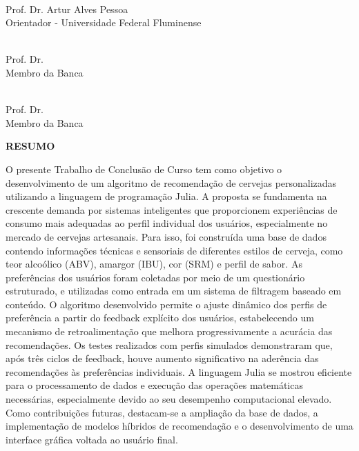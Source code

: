 \documentclass[12pt,a4paper]{article}
\begin{document}
\vspace{4cm}

\begin{center}
\underline{\hspace{8cm}}\\
Prof. Dr. Artur Alves Pessoa\\
Orientador - Universidade Federal Fluminense

\vspace{2cm}

\underline{\hspace{8cm}}\\
Prof. Dr. \underline{\hspace{4cm}}\\
Membro da Banca

\vspace{2cm}

\underline{\hspace{8cm}}\\
Prof. Dr. \underline{\hspace{4cm}}\\
Membro da Banca
\end{center}

\newpage
\begin{center}
\Large
\textbf{RESUMO}
\end{center}

\vspace{1cm}

O presente Trabalho de Conclusão de Curso tem como objetivo o desenvolvimento de um algoritmo de recomendação de cervejas personalizadas utilizando a linguagem de programação Julia. A proposta se fundamenta na crescente demanda por sistemas inteligentes que proporcionem experiências de consumo mais adequadas ao perfil individual dos usuários, especialmente no mercado de cervejas artesanais. Para isso, foi construída uma base de dados contendo informações técnicas e sensoriais de diferentes estilos de cerveja, como teor alcoólico (ABV), amargor (IBU), cor (SRM) e perfil de sabor. As preferências dos usuários foram coletadas por meio de um questionário estruturado, e utilizadas como entrada em um sistema de filtragem baseado em conteúdo. O algoritmo desenvolvido permite o ajuste dinâmico dos perfis de preferência a partir do feedback explícito dos usuários, estabelecendo um mecanismo de retroalimentação que melhora progressivamente a acurácia das recomendações. Os testes realizados com perfis simulados demonstraram que, após três ciclos de feedback, houve aumento significativo na aderência das recomendações às preferências individuais. A linguagem Julia se mostrou eficiente para o processamento de dados e execução das operações matemáticas necessárias, especialmente devido ao seu desempenho computacional elevado. Como contribuições futuras, destacam-se a ampliação da base de dados, a implementação de modelos híbridos de recomendação e o desenvolvimento de uma interface gráfica voltada ao usuário final.
\end{document}
